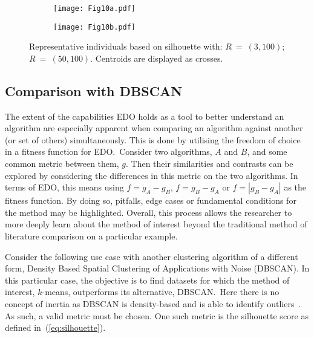 \begin{figure}
    \centering
    \begin{subfigure}{\imgwidth}
        \texttt{[image: Fig10a.pdf]}
        \caption{}\label{fig:edo:small:silhouette:inds}
    \end{subfigure}

    \begin{subfigure}{\imgwidth}
        \texttt{[image: Fig10b.pdf]}
        \caption{}\label{fig:edo:large:silhouette:inds}
    \end{subfigure}
    \caption{%
        Representative individuals based on silhouette with:
         \(R~=~(3,100)\);
         \(R~=~(50,100)\). Centroids are
        displayed as crosses.
    }\label{fig:silhouette-inds}
\end{figure}

\subsection{Comparison with DBSCAN}\label{subsec:dbscan}

The extent of the capabilities EDO holds as a tool to better understand an
algorithm are especially apparent when comparing an algorithm against another
(or set of others) simultaneously. This is done by utilising the freedom of
choice in a fitness function for EDO.\ Consider two algorithms, \(A\) and \(B\),
and some common metric between them, \(g\). Then their similarities and
contrasts can be explored by considering the differences in this metric on the
two algorithms. In terms of EDO, this means using \(f = g_A - g_B\), \(f = g_B -
g_A\) or \(f = \left| g_B - g_A \right|\) as the fitness function. By doing so,
pitfalls, edge cases or fundamental conditions for the method may be
highlighted. Overall, this process allows the researcher to more deeply learn
about the method of interest beyond the traditional method of literature
comparison on a particular example.

Consider the following use case with another clustering algorithm of a different
form, Density Based Spatial Clustering of Applications with Noise (DBSCAN). In
this particular case, the objective is to find datasets for which the method of
interest, \(k\)-means, outperforms its alternative, DBSCAN.\ Here there is no
concept of inertia as DBSCAN is density-based and is able to identify
outliers~\cite{Ester1996}. As such, a valid metric must be chosen. One such
metric is the silhouette score as defined in~(\ref{eq:silhouette}).


